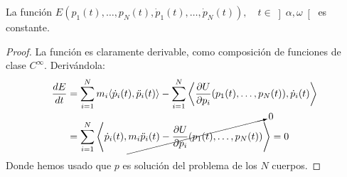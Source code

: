 \begin{lema}\label{Lema:conservacion_energia}
    La función $E(p_1(t),\ldots,p_N(t),\dot{p}_1(t), \ldots,\dot{p}_N(t)), \quad t\in \left]\alpha,\omega\right[$ es constante.
    \begin{proof}
        La función es claramente derivable, como composición de funciones de clase $C^\infty$. Derivándola:
        \begin{align*}
            \frac{dE}{dt} &= \sum_{i=1}^N m_i \langle \dot{p}_i(t), \ddot{p}_i(t) \rangle  - \sum_{i=1}^N \left\langle \frac{\partial U}{\partial p_i}(p_1(t),\ldots,p_N(t)),\dot{p}_i(t) \right\rangle  \\
                          &= \sum_{i=1}^{N} \left\langle \dot{p}_i(t), \cancelto{0}{m_i\ddot{p}_i(t) - \frac{\partial U}{\partial p_i}(p_1(t),\ldots,p_N(t))} \right\rangle  = 0
        \end{align*}
        Donde hemos usado que $p$ es solución del problema de los $N$ cuerpos.
    \end{proof}
\end{lema}
